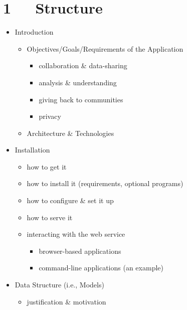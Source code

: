 \documentclass[letterpaper,10pt,english]{sphinxmanual}
\begin{document}
\chapter{1   Structure}
\label{documentation::doc}\label{documentation:welcome-to-old-s-documentation}\label{documentation:structure}\begin{itemize}
\item {} 
Introduction
\begin{itemize}
\item {} 
Objectives/Goals/Requirements of the Application
\begin{itemize}
\item {} 
collaboration \& data-sharing

\item {} 
analysis \& understanding

\item {} 
giving back to communities

\item {} 
privacy

\end{itemize}

\item {} 
Architecture \& Technologies

\end{itemize}

\item {} 
Installation
\begin{itemize}
\item {} 
how to get it

\item {} 
how to install it (requirements, optional programs)

\item {} 
how to configure \& set it up

\item {} 
how to serve it

\item {} 
interacting with the web service
\begin{itemize}
\item {} 
browser-based applications

\item {} 
command-line applications (an example)

\end{itemize}

\end{itemize}

\item {} 
Data Structure (i.e., Models)
\begin{itemize}
\item {} 
justification \& motivation


\end{itemize}
\end{itemize}
\end{document}

